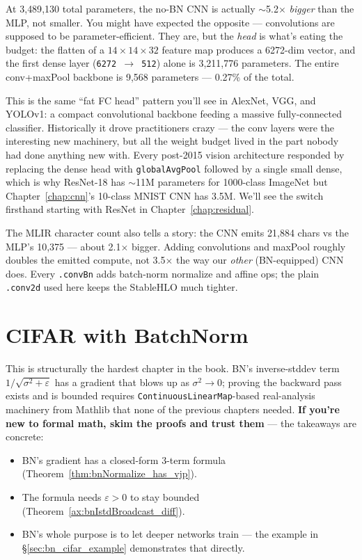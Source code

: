 At 3{,}489{,}130 total parameters, the no-BN CNN is actually
$\sim$5.2$\times$ \emph{bigger} than the MLP, not smaller. You
might have expected the opposite --- convolutions are supposed to
be parameter-efficient. They are, but the \emph{head} is what's
eating the budget: the flatten of a $14 \times 14 \times 32$ feature
map produces a 6272-dim vector, and the first dense layer
(\texttt{6272 $\to$ 512}) alone is 3{,}211{,}776 parameters. The
entire conv+maxPool backbone is 9{,}568 parameters --- 0.27\% of
the total.

This is the same ``fat FC head'' pattern you'll see in AlexNet, VGG,
and YOLOv1: a compact convolutional backbone feeding a massive
fully-connected classifier. Historically it drove practitioners
crazy --- the conv layers were the interesting new machinery, but
all the weight budget lived in the part nobody had done anything
new with. Every post-2015 vision architecture responded by
replacing the dense head with \texttt{globalAvgPool} followed by a
single small dense, which is why ResNet-18 has $\sim$11M parameters
for 1000-class ImageNet but Chapter~\ref{chap:cnn}'s 10-class MNIST
CNN has 3.5M. We'll see the switch firsthand starting with ResNet
in Chapter~\ref{chap:residual}.

The MLIR character count also tells a story: the CNN emits 21{,}884
chars vs the MLP's 10{,}375 --- about 2.1$\times$ bigger. Adding
convolutions and maxPool roughly doubles the emitted compute, not
3.5$\times$ the way our \emph{other} (BN-equipped) CNN does. Every
\texttt{.convBn} adds batch-norm normalize and affine ops; the
plain \texttt{.conv2d} used here keeps the StableHLO much tighter.

\chapter{CIFAR with BatchNorm}
\label{chap:bn}

This is structurally the hardest chapter in the book. BN's
inverse-stddev term \(1/\sqrt{\sigma^2 + \varepsilon}\) has a
gradient that blows up as \(\sigma^2 \to 0\); proving the
backward pass exists and is bounded requires
\texttt{ContinuousLinearMap}-based real-analysis machinery from
Mathlib that none of the previous chapters needed.
\textbf{If you're new to formal math, skim the proofs and trust
them} --- the takeaways are concrete:

\begin{itemize}
\item BN's gradient has a closed-form 3-term formula
  (Theorem~\ref{thm:bnNormalize_has_vjp}).
\item The formula needs \(\varepsilon > 0\) to stay bounded
  (Theorem~\ref{ax:bnIstdBroadcast_diff}).
\item BN's whole purpose is to let deeper networks train --- the
  example in \S\ref{sec:bn_cifar_example} demonstrates that directly.
\end{itemize}

